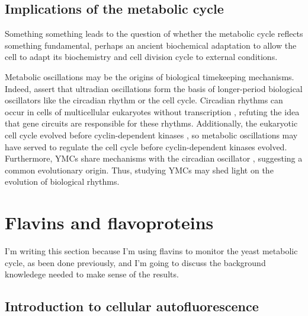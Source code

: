 \subsection{Implications of the metabolic cycle}
\label{subsec:intro-ymc-implications}

Something something leads to the question of whether the metabolic cycle reflects something fundamental, perhaps an ancient biochemical adaptation to allow the cell to adapt its biochemistry and cell division cycle to external conditions.

Metabolic oscillations may be the origins of biological timekeeping mechanisms.
Indeed, \citet{lloydRedoxRhythmicityClocks2007} assert that ultradian oscillations form the basis of longer-period biological oscillators like the circadian rhythm or the cell cycle. %
Circadian rhythms can occur in cells of multicellular eukaryotes without transcription \citep{oneillCircadianRhythmsPersist2011}, refuting the idea that gene circuits are responsible for these rhythms.
Additionally, the eukaryotic cell cycle evolved before cyclin-dependent kinases \citep{papagiannakisAutonomousMetabolicOscillations2017}, so metabolic oscillations may have served to regulate the cell cycle before cyclin-dependent kinases evolved.
Furthermore, YMCs share mechanisms with the circadian oscillator \citep{caustonMetabolicCyclesYeast2015,arataQuantitativeStudiesCellDivision2019}, suggesting a common evolutionary origin.
Thus, studying YMCs may shed light on the evolution of biological rhythms.

\section{Flavins and flavoproteins}
\label{sec:intro-flavin}
I'm writing this section because I'm using flavins to monitor the yeast metabolic cycle, as been done previously, and I'm going to discuss the background knowledege needed to make sense of the results.

\subsection{Introduction to cellular autofluorescence}
\label{subsec:intro-flavin-autofluo}

